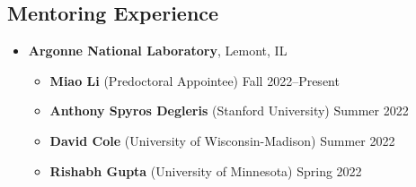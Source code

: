 \documentclass[letterpaper, 11pt]{article}
\begin{document}
\subsection*{Mentoring Experience}
\begin{itemize}[leftmargin=*]
\item[] {\bf Argonne National Laboratory}, Lemont, IL
  \begin{itemize}[leftmargin=*]
  \item[] {\bf Miao Li} (Predoctoral Appointee) \hfill Fall 2022--Present
  \item[] {\bf Anthony Spyros Degleris} (Stanford University) \hfill Summer 2022
  \item[] {\bf David Cole} (University of Wisconsin-Madison) \hfill Summer 2022
  \item[] {\bf Rishabh Gupta} (University of Minnesota) \hfill Spring 2022

\end{itemize}
\end{itemize}
\end{document}

